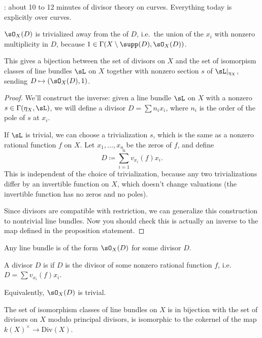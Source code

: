 
\TODO: about 10 to 12 minutes of divisor theory on curves. Everything today is explicitly over curves.
\begin{rem}
$\sO_X(D)$ is trivialized away from the  of $D$, i.e.\ the union of the $x_i$ with nonzero multiplicity in $D$, because $1\in\Gamma(X\setminus\supp(D), \sO_X(D))$.
\end{rem}
\begin{prop}
This gives a bijection between the set of divisors on $X$ and the set of isomorpism classes of line bundles $\sL$ on $X$ together with nonzero section $s$ of $\sL|_{\eta_X}$, sending $D\mapsto (\sO_X(D), 1)$.
\end{prop}
\begin{proof}
We'll construct the inverse: given a line bundle $\sL$ on $X$ with a nonzero $s\in\Gamma(\eta_X, \sL)$, we will define a divisor $D = \sum n_ix_i$, where $n_i$ is the order of the pole of $s$ at $x_i$.

If $\sL$ is trivial, we can choose a trivialization $s$, which is the same as a nonzero rational function $f$ on $X$. Let $x_1,\dotsc,x_n$ be the zeros of $f$, and define
\begin{equation}
    D\coloneqq \sum_{i=1}^n v_{x_i}(f) x_i.
\end{equation}
This is independent of the choice of trivialization, because any two trivializations differ by an invertible function on $X$, which doesn't change valuations (the invertible function has no zeros and no poles).

Since divisors are compatible with restriction, we can generalize this construction to nontrivial line bundles. Now you should check this is actually an inverse to the map defined in the proposition statement.
\end{proof}
\begin{cor}
Any line bundle is of the form $\sO_X(D)$ for some divisor $D$.
\end{cor}
\begin{defn}
A divisor $D$ is  if $D$ is the divisor of some nonzero rational function $f$, i.e.\ $D = \sum v_{x_i}(f) x_i$.
\end{defn}
Equivalently, $\sO_X(D)$ is trivial.
\begin{cor}
The set of isomorphism classes of line bundles on $X$ is in bijection with the set of divisors on $X$ modulo principal divisors, is isomorphic to the cokernel of the map $k(X)^\times\to\mathrm{Div}(X)$.
\end{cor}
